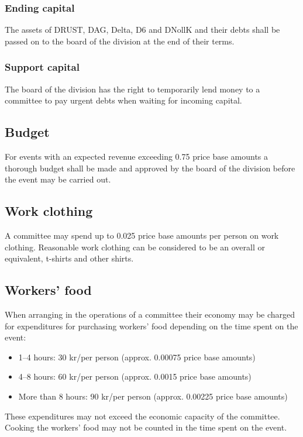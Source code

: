 \documentclass[a4paper]{dtek}
\begin{document}
\subsubsection{Ending capital}
The assets of DRUST, DAG, Delta, D6 and DNollK and their debts shall be passed on to the board of the division at the end of their terms. 

\subsubsection{Support capital}
The board of the division has the right to temporarily lend money to a committee to pay urgent debts when waiting for incoming capital.

\subsection{Budget}
For events with an expected revenue exceeding 0.75 price base amounts a thorough budget shall be made and approved by the board of the division before the event may be carried out.

\subsection{Work clothing}
A committee may spend up to 0.025 price base amounts per person on work clothing. Reasonable work clothing can be considered to be an overall or equivalent, t-shirts and other shirts.

\subsection{Workers' food}
When arranging in the operations of a committee their economy may be charged for expenditures for purchasing workers' food depending on the time spent on the event:
\begin{itemize}
    \item 1--4 hours: 30 kr/per person (approx. 0.00075 price base amounts)
    \item 4--8 hours: 60 kr/per person (approx. 0.0015 price base amounts)
    \item More than 8 hours: 90 kr/per person (approx. 0.00225 price base amounts)
\end{itemize}
These expenditures may not exceed the economic capacity of the committee. Cooking the workers' food may not be counted in the time spent on the event.

\end{document}
